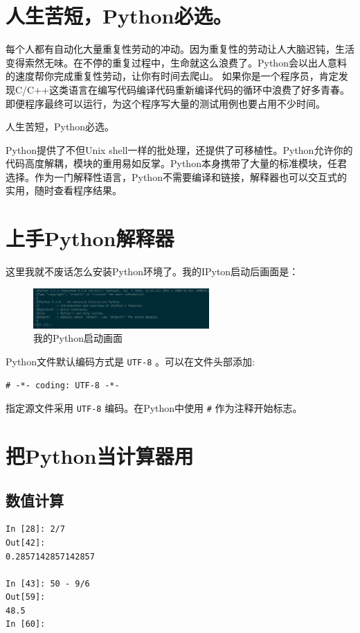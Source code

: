 \documentclass[10pt,a4paper,UTF8]{article}
\begin{document}
\section{人生苦短，Python必选。}
\label{sec:orgheadline2}


每个人都有自动化大量重复性劳动的冲动。因为重复性的劳动让人大脑迟钝，生活变得索然无味。在不停的重复过程中，生命就这么浪费了。Python会以出人意料的速度帮你完成重复性劳动，让你有时间去爬山。 如果你是一个程序员，肯定发现C/C++这类语言在编写代码编译代码重新编译代码的循环中浪费了好多青春。即便程序最终可以运行，为这个程序写大量的测试用例也要占用不少时间。

人生苦短，Python必选。

Python提供了不但Unix shell一样的批处理，还提供了可移植性。Python允许你的代码高度解耦，模块的重用易如反掌。Python本身携带了大量的标准模块，任君选择。作为一门解释性语言，Python不需要编译和链接，解释器也可以交互式的实用，随时查看程序结果。

\section{上手Python解释器}
\label{sec:orgheadline3}


这里我就不废话怎么安装Python环境了。我的IPyton启动后画面是：
\begin{figure}[htb]
\centering
\includegraphics[width=0.6\textwidth]{../../img/20170312PythonDay01.PNG}
\caption{\label{fig:orgparagraph1}
我的Python启动画面}
\end{figure}

Python文件默认编码方式是 \texttt{UTF-8} 。可以在文件头部添加: 
\begin{verbatim}
# -*- coding: UTF-8 -*-
\end{verbatim}
指定源文件采用 \texttt{UTF-8} 编码。在Python中使用 \texttt{\#} 作为注释开始标志。

\section{把Python当计算器用}
\label{sec:orgheadline7}


\subsection{数值计算}
\label{sec:orgheadline4}
\lstset{language=Python,label= ,caption= ,captionpos=b,numbers=none}
\begin{lstlisting}
In [28]: 2/7 
Out[42]: 
0.2857142857142857

In [43]: 50 - 9/6
Out[59]: 
48.5
In [60]:
\end{lstlisting}
\end{document}
